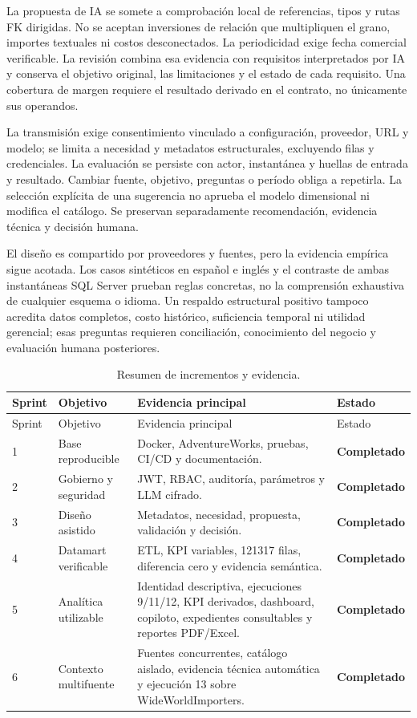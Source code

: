 \documentclass[11pt,letterpaper]{article}
\newcommand{\ok}{\textcolor{success}{\textbf{Completado}}}
\begin{document}
La propuesta de IA se somete a comprobación local de referencias, tipos y rutas FK
dirigidas. No se aceptan inversiones de relación que multipliquen el grano, importes
textuales ni costos desconectados. La periodicidad exige fecha comercial verificable.
La revisión combina esa evidencia con requisitos interpretados por IA y conserva el
objetivo original, las limitaciones y el estado de cada requisito. Una cobertura de
margen requiere el resultado derivado en el contrato, no únicamente sus operandos.

La transmisión exige consentimiento vinculado a configuración, proveedor, URL y modelo;
se limita a necesidad y metadatos estructurales, excluyendo filas y credenciales. La
evaluación se persiste con actor, instantánea y huellas de entrada y resultado. Cambiar
fuente, objetivo, preguntas o período obliga a repetirla. La selección explícita de una
sugerencia no aprueba el modelo dimensional ni modifica el catálogo. Se preservan
separadamente recomendación, evidencia técnica y decisión humana.

El diseño es compartido por proveedores y fuentes, pero la evidencia empírica sigue
acotada. Los casos sintéticos en español e inglés y el contraste de ambas instantáneas
SQL Server prueban reglas concretas, no la comprensión exhaustiva de cualquier esquema
o idioma. Un respaldo estructural positivo tampoco acredita datos completos, costo
histórico, suficiencia temporal ni utilidad gerencial; esas preguntas requieren
conciliación, conocimiento del negocio y evaluación humana posteriores.

\begin{longtable}{@{}p{}p{}p{}p{}@{}}
  \caption{Resumen de incrementos y evidencia.}\\
  \toprule
  Sprint & Objetivo & Evidencia principal & Estado \\
  \midrule
  \endfirsthead
  \toprule
  Sprint & Objetivo & Evidencia principal & Estado \\
  \midrule
  \endhead
  1 & Base reproducible & Docker, AdventureWorks, pruebas, CI/CD y documentación. & \ok \\
  2 & Gobierno y seguridad & JWT, RBAC, auditoría, parámetros y LLM cifrado. & \ok \\
  3 & Diseño asistido & Metadatos, necesidad, propuesta, validación y decisión. & \ok \\
  4 & Datamart verificable & ETL, KPI variables, 121317 filas, diferencia cero y evidencia semántica. & \ok \\
  5 & Analítica utilizable & Identidad descriptiva, ejecuciones 9/11/12, KPI derivados, dashboard, copiloto, expedientes consultables y reportes PDF/Excel. & \ok \\
  6 & Contexto multifuente & Fuentes concurrentes, catálogo aislado, evidencia técnica automática y ejecución 13 sobre WideWorldImporters. & \ok \\
  \bottomrule
\end{longtable}
\end{document}
